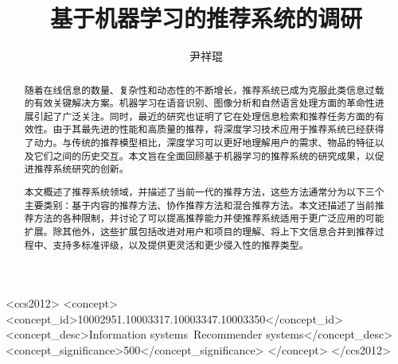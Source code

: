 \documentclass[sigconf]{acmart}
\begin{document}
\title{基于机器学习的推荐系统的调研}


\author{尹祥琨}
\affiliation
{
}

\begin{abstract}
  随着在线信息的数量、复杂性和动态性的不断增长，推荐系统已成为克服此类信息过载的有效关键解决方案。机器学习在语音识别、图像分析和自然语言处理方面的革命性进展引起了广泛关注。同时，最近的研究也证明了它在处理信息检索和推荐任务方面的有效性。由于其最先进的性能和高质量的推荐，将深度学习技术应用于推荐系统已经获得了动力。与传统的推荐模型相比，深度学习可以更好地理解用户的需求、物品的特征以及它们之间的历史交互。本文旨在全面回顾基于机器学习的推荐系统的研究成果，以促进推荐系统研究的创新。

  本文概述了推荐系统领域，并描述了当前一代的推荐方法，这些方法通常分为以下三个主要类别：基于内容的推荐方法、协作推荐方法和混合推荐方法。本文还描述了当前推荐方法的各种限制，并讨论了可以提高推荐能力并使推荐系统适用于更广泛应用的可能扩展。除其他外，这些扩展包括改进对用户和项目的理解、将上下文信息合并到推荐过程中、支持多标准评级，以及提供更灵活和更少侵入性的推荐类型。
\end{abstract}

\begin{CCSXML}
  <ccs2012>
     <concept>
         <concept_id>10002951.10003317.10003347.10003350</concept_id>
         <concept_desc>Information systems~Recommender systems</concept_desc>
         <concept_significance>500</concept_significance>
         </concept>
   </ccs2012>
\end{CCSXML}
  

\end{document}
